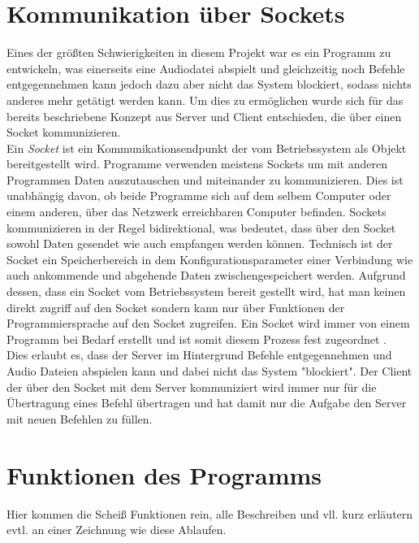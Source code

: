 \section{Kommunikation über Sockets}
Eines der größten Schwierigkeiten in diesem Projekt war es ein Programm zu entwickeln, was einerseits eine Audiodatei abspielt und gleichzeitig noch Befehle entgegennehmen kann jedoch dazu aber nicht das System blockiert, sodass nichts anderes mehr getätigt werden kann. Um dies zu ermöglichen wurde sich für das bereits beschriebene Konzept aus Server und Client entschieden, die über einen Socket kommunizieren. \\
Ein \textit{Socket} ist ein Kommunikationsendpunkt der vom Betriebssystem als Objekt bereitgestellt wird. Programme verwenden meistens Sockets um mit anderen Programmen Daten auszutauschen und miteinander zu kommunizieren. Dies ist unabhängig davon, ob beide Programme sich auf dem selbem Computer oder einem anderen, über das Netzwerk erreichbaren Computer befinden. Sockets kommunizieren in der Regel bidirektional, was bedeutet, dass über den Socket sowohl Daten gesendet wie auch empfangen werden können. Technisch ist der Socket ein Speicherbereich in dem Konfigurationsparameter einer Verbindung wie auch ankommende und abgehende Daten zwischengespeichert werden. Aufgrund dessen, dass ein Socket vom Betriebssystem bereit gestellt wird, hat man keinen direkt zugriff auf den Socket sondern kann nur über Funktionen der Programmiersprache auf den Socket zugreifen.
Ein Socket wird immer von einem Programm bei Bedarf erstellt und ist somit diesem Prozess fest zugeordnet \autocite{pollakowski_2012}. \\
Dies erlaubt es, dass der Server im Hintergrund Befehle entgegennehmen und Audio Dateien abspielen kann und dabei nicht das System "blockiert". Der Client der über den Socket mit dem Server kommuniziert wird immer nur für die Übertragung eines Befehl übertragen und hat damit nur die Aufgabe den Server mit neuen Befehlen zu füllen.

\section{Funktionen des Programms}
Hier kommen die Scheiß Funktionen rein, alle Beschreiben und vll. kurz erläutern evtl. an einer Zeichnung wie diese Ablaufen.

